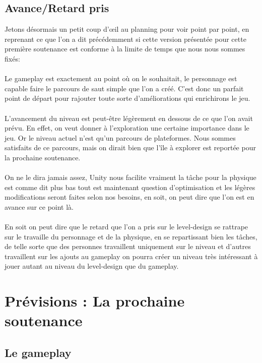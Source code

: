 \documentclass[a4paper]{article}
\begin{document}
\pagebreak

\subsection{Avance/Retard pris}
\vspace{0.5 cm}


Jetons désormais un petit coup d’œil au planning pour voir point par point, en reprenant ce que l'on a dit précédemment  si cette version présentée pour cette première soutenance est conforme à la limite de temps que nous nous sommes fixés:\\
\\
Le gameplay est exactement au point où on le souhaitait, le personnage est capable  faire le parcours de saut simple que l'on a créé. C'est donc un parfait point de départ pour rajouter toute sorte d'améliorations qui enrichirons le jeu.\\
\\
L'avancement du niveau est peut-être légèrement en dessous de ce que l'on avait prévu. En effet, on veut donner à l'exploration une certaine importance dans le jeu. Or le niveau actuel n'est qu'un parcours de plateformes. Nous sommes satisfaits de ce parcours, mais on dirait bien que l'île à explorer est reportée pour la prochaine soutenance.\\
\\
On ne le dira jamais assez, Unity nous facilite vraiment la tâche pour la physique est comme dit plus bas tout est maintenant question d'optimisation et les légères modifications seront faites selon nos besoins, en soit, on peut dire que l'on est en avance sur ce point là.\\
\\
En soit on peut dire que le retard que l'on a pris sur le level-design se rattrape sur le travaille du personnage et de la physique, en se repartissant bien les tâches, de telle sorte  que des personnes travaillent uniquement sur le niveau et d'autres travaillent sur les ajouts au gameplay on pourra créer un niveau très intéressant à jouer autant au niveau du level-design que du gameplay.


\pagebreak

\section{Prévisions : La prochaine soutenance}
\vspace{0.5 cm}

\subsection{Le gameplay}
\vspace{0.5 cm}
\end{document}
